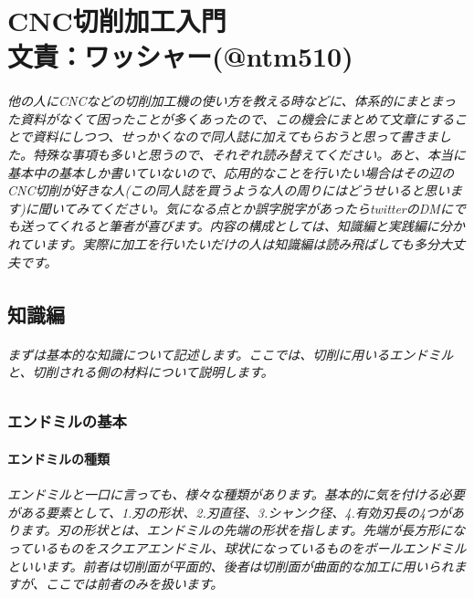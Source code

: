 \documentclass[b5paper, 9pt, twocolumn, titlepage,openany]{jsbook}%
\begin{document}
\part*{CNC切削加工入門\\文責：ワッシャー(@ntm510)}

\paragraph{他の人にCNCなどの切削加工機の使い方を教える時などに、体系的にまとまった資料がなくて困ったことが多くあったので、この機会にまとめて文章にすることで資料にしつつ、せっかくなので同人誌に加えてもらおうと思って書きました。特殊な事項も多いと思うので、それぞれ読み替えてください。あと、本当に基本中の基本しか書いていないので、応用的なことを行いたい場合はその辺のCNC切削が好きな人(この同人誌を買うような人の周りにはどうせいると思います)に聞いてみてください。気になる点とか誤字脱字があったらtwitterのDMにでも送ってくれると筆者が喜びます。内容の構成としては、知識編と実践編に分かれています。実際に加工を行いたいだけの人は知識編は読み飛ばしても多分大丈夫です。}

\chapter{知識編}

\paragraph{まずは基本的な知識について記述します。ここでは、切削に用いるエンドミルと、切削される側の材料について説明します。}

\section{エンドミルの基本}

\subsection{エンドミルの種類}

\paragraph{エンドミルと一口に言っても、様々な種類があります。基本的に気を付ける必要がある要素として、1.刃の形状、2.刃直径、3.シャンク径、4.有効刃長の4つがあります。刃の形状とは、エンドミルの先端の形状を指します。先端が長方形になっているものをスクエアエンドミル、球状になっているものをボールエンドミルといいます。前者は切削面が平面的、後者は切削面が曲面的な加工に用いられますが、ここでは前者のみを扱います。}
\end{document}
